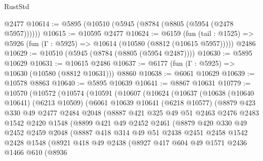 \begin{lexlean}{RustStd}
\begin{coremodule}
{{    @2477
@10614 := @5895 (@10510 (@5945 (@8784 (@8805 (@5954 (@2478 @5957))))))
@10615 := @10595 @2477
@10624 := @6159
    (fun (tail : @1525) => @5926 (fun (Γ : @5925) => @10614 (@10580 (@8812 (@10615 @5957)))))
    @2486
@10629 := @10510 (@5945 (@8784 (@8805 (@5954 @2487))))
@10630 := @5895 @10629
@10631 := @10615 @2486
@10637 := @6177 (fun (Γ : @5925) => @10630 (@10580 (@8812 @10631))) @8860
@10638 := @6061 @10629
@10639 := @10578 @8863
@10640 := @5895 @10639
@10641 := @8867 @10631
@10779 := @10570
    (@10572
      (@10574
        (@10591
          (@10607
            (@10624
              (@10637
                (@10638
                  (@10640 @10641)
                  (@6213 @10509)
                  (@6061
                    @10639
                    @10641
                    (@6218 @10577)
                    (@8879
                      @423
                      @330
                      @49
                      @2477
                      @2484
                      @2048
                      (@8887
                        @421
                        @325
                        @49
                        @51
                        @2463
                        @2476
                        @2483
                        @1542
                        @2420
                        @1548
                        (@8899
                          @421
                          @49
                          @2452
                          @2461
                          (@8879
                            @420
                            @330
                            @49
                            @2452
                            @2459
                            @2048
                            (@8887
                              @418
                              @314
                              @49
                              @51
                              @2438
                              @2451
                              @2458
                              @1542
                              @2428
                              @1548
                              (@8921
                                @418
                                @49
                                @2438
                                (@8927
                                  @417
                                  @604
                                  @49
                                  @1571
                                  @2436
                                  @1466
                                  @610
                                  (@8936
}}
\end{coremodule}
\end{lexlean}
